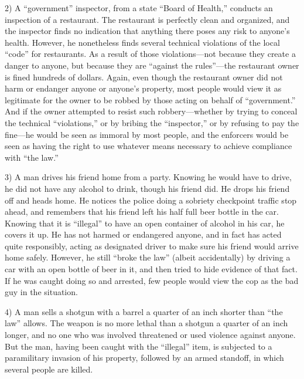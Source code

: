 \documentclass{book}
\begin{document}
2) A \enquote{government} inspector, from a state \enquote{Board of Health,} conducts an inspection of a restaurant. The restaurant is perfectly clean and organized, and the inspector finds no indication that anything there poses any risk to anyone's health. However, he nonetheless finds several technical violations of the local \enquote{code} for restaurants. As a result of those violations---not because they create a danger to anyone, but because they are \enquote{against the rules}---the restaurant owner is fined hundreds of dollars. Again, even though the restaurant owner did not harm or endanger anyone or anyone's property, most people would view it as legitimate for the owner to be robbed by those acting on behalf of \enquote{government.} And if the owner attempted to resist such robbery---whether by trying to conceal the technical \enquote{violations,} or by bribing the \enquote{inspector,} or by refusing to pay the fine---he would be seen as immoral by most people, and the enforcers would be seen as having the right to use whatever means necessary to achieve compliance with \enquote{the law.}

3) A man drives his friend home from a party. Knowing he would have to drive, he did not have any alcohol to drink, though his friend did. He drops his friend off and heads home. He notices the police doing a sobriety checkpoint traffic stop ahead, and remembers that his friend left his half full beer bottle in the car. Knowing that it is \enquote{illegal} to have an open container of alcohol in his car, he covers it up. He has not harmed or endangered anyone, and in fact has acted quite responsibly, acting as designated driver to make sure his friend would arrive home safely. However, he still \enquote{broke the law} (albeit accidentally) by driving a car with an open bottle of beer in it, and then tried to hide evidence of that fact. If he was caught doing so and arrested, few people would view the cop as the bad guy in the situation.

4) A man sells a shotgun with a barrel a quarter of an inch shorter than \enquote{the law} allows. The weapon is no more lethal than a shotgun a quarter of an inch longer, and no one who was involved threatened or used violence against anyone. But the man, having been caught with the \enquote{illegal} item, is subjected to a paramilitary invasion of his property, followed by an armed standoff, in which several people are killed.
\end{document}
